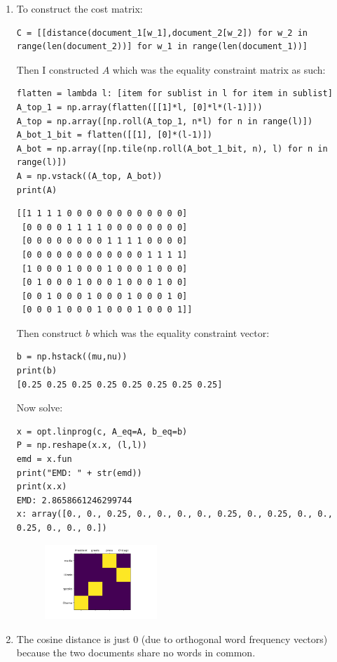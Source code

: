 \documentclass[11pt]{article}
\begin{document}
\begin{solution}
\begin{enumerate}
\item To construct the cost matrix:
\begin{verbatim}
C = [[distance(document_1[w_1],document_2[w_2]) for w_2 in range(len(document_2))] for w_1 in range(len(document_1))]
\end{verbatim}
Then I constructed $A$ which was the equality constraint matrix as such:
\begin{verbatim}
flatten = lambda l: [item for sublist in l for item in sublist]
A_top_1 = np.array(flatten([[1]*l, [0]*l*(l-1)]))
A_top = np.array([np.roll(A_top_1, n*l) for n in range(l)])
A_bot_1_bit = flatten([[1], [0]*(l-1)])
A_bot = np.array([np.tile(np.roll(A_bot_1_bit, n), l) for n in range(l)])
A = np.vstack((A_top, A_bot))
print(A)
\end{verbatim}
\begin{verbatim}
[[1 1 1 1 0 0 0 0 0 0 0 0 0 0 0 0]
 [0 0 0 0 1 1 1 1 0 0 0 0 0 0 0 0]
 [0 0 0 0 0 0 0 0 1 1 1 1 0 0 0 0]
 [0 0 0 0 0 0 0 0 0 0 0 0 1 1 1 1]
 [1 0 0 0 1 0 0 0 1 0 0 0 1 0 0 0]
 [0 1 0 0 0 1 0 0 0 1 0 0 0 1 0 0]
 [0 0 1 0 0 0 1 0 0 0 1 0 0 0 1 0]
 [0 0 0 1 0 0 0 1 0 0 0 1 0 0 0 1]]
\end{verbatim}
Then construct $b$ which was the equality constraint vector:
\begin{verbatim}
b = np.hstack((mu,nu))
print(b)
[0.25 0.25 0.25 0.25 0.25 0.25 0.25 0.25]
\end{verbatim}
Now solve:
\begin{verbatim}
x = opt.linprog(c, A_eq=A, b_eq=b)
P = np.reshape(x.x, (l,l))
emd = x.fun
print("EMD: " + str(emd))
print(x.x)
EMD: 2.8658661246299744
x: array([0., 0., 0.25, 0., 0., 0., 0., 0.25, 0., 0.25, 0., 0., 0.25, 0., 0., 0.])
\end{verbatim}
\begin{figure}[H]
    \centerline{\includegraphics[width=0.4\textwidth]{problem1_kantorovich_plan.png}}
\end{figure}

\item The cosine distance is just 0 (due to orthogonal word frequency vectors) because the two documents share no words in common.


\end{enumerate}
\end{solution}
\end{document}
